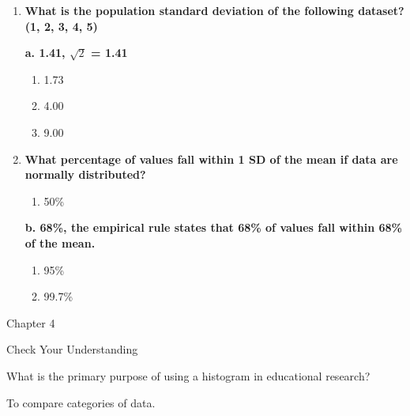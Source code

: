\documentclass[
  letterpaper,
  DIV=11,
  numbers=noendperiod]{scrreprt}
\providecommand{\tightlist}{%
  \setlength{\itemsep}{0pt}\setlength{\parskip}{0pt}}
\begin{document}
\begin{enumerate}
  \begin{enumerate}
  \def\labelenumii{\alph{enumii}.}
  \tightlist
  \item
    1
  \end{enumerate}

  \textbf{b. 2, mean = 3, subtract each value from the mean, square the
  results, sum the squares, and divide by 5.}

  \begin{enumerate}
  \def\labelenumii{\alph{enumii}.}
  \setcounter{enumii}{2}
  \item
    2.5
  \item
    3
  \end{enumerate}
\item
  \textbf{What is the population standard deviation of the following
  dataset? (1, 2, 3, 4, 5)}

  \textbf{a. 1.41, \(\sqrt{2}\) = 1.41}

  \begin{enumerate}
  \def\labelenumii{\alph{enumii}.}
  \setcounter{enumii}{1}
  \item
    1.73
  \item
    4.00
  \item
    9.00
  \end{enumerate}
\item
  \textbf{What percentage of values fall within 1 SD of the mean if data
  are normally distributed?}

  \begin{enumerate}
  \def\labelenumii{\alph{enumii}.}
  \tightlist
  \item
    50\%
  \end{enumerate}

  \textbf{b. 68\%, the empirical rule states that 68\% of values fall
  within 68\% of the mean.}

  \begin{enumerate}
  \def\labelenumii{\alph{enumii}.}
  \setcounter{enumii}{2}
  \item
    95\%
  \item
    99.7\%
  \end{enumerate}
\end{enumerate}

Chapter 4

Check Your Understanding

What is the primary purpose of using a histogram in educational
research?

To compare categories of data.
\end{document}
